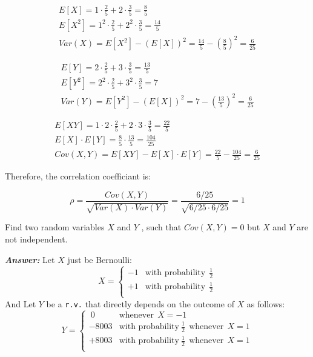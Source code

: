 \documentclass[12pt]{article}
\newenvironment{question}[2][Question]{\begin{trivlist}
\item[\hskip \labelsep {\bfseries #1}\hskip \labelsep {\bfseries #2.}]}{\end{trivlist}}
\begin{document}
\begin{align*}
E[X] = 1 \cdot \frac{2}{5} +  2 \cdot \frac{3}{5} = \frac{8}{5}        \\
E[X^2] = 1^2 \cdot  \frac{2}{5} +  2^2 \cdot \frac{3}{5} = \frac{14}{5}  \\
Var(X) = E[X^2]  - (E[X])^2 =  \frac{14}{5} - \left(\frac{8}{5} \right)^2 = \frac{6}{25}
\end{align*}


\begin{align*}
E[Y] = 2 \cdot \frac{2}{5} +  3 \cdot \frac{3}{5} = \frac{13}{5}        \\
E[Y^2] = 2^2 \cdot  \frac{2}{5} +  3^2 \cdot \frac{3}{5} = 7  \\
Var(Y) = E[Y^2]  - (E[X])^2 =  7 - \left(\frac{13}{5} \right)^2 = \frac{6}{25}
\end{align*}
 

\begin{align*}
E[XY] = 1 \cdot 2 \cdot \frac{2}{5} +  2 \cdot 3 \cdot \frac{3}{5} = \frac{22}{5}        \\
E[X] \cdot E[Y] = \frac{8}{5} \cdot \frac{13}{5} = \frac{104}{25}  \\
Cov(X,Y) = E[XY] - E[X] \cdot E[Y] = \frac{22}{5}  -  \frac{104}{25} = \frac{6}{25}
\end{align*}

Therefore, the correlation coefficiant is:

$$
\rho = \frac{Cov(X,Y)} {\sqrt{ Var(X) \cdot Var(Y) }} = \frac{6/25} {\sqrt{6/25 \cdot 6/25}} = 1
$$


\bigskip
\bigskip
\begin{question}{3.2}

Find two random variables $X$ and $Y$ , such that $Cov(X, Y ) = 0$ but $X$ and $Y$ are not independent.

\end{question}

 \textbf{\color{TealBlue}\emph{Answer:} } 
Let $X$ just be Bernoulli:
  \[ 
X = 
  \begin{cases} 
       -1    &  \text{with probability} \ \   \frac{1}{2} \\
       +1  &  \text{with probability}  \ \ \frac{1}{2} \\
   \end{cases}
\]
And Let $Y$ be a \texttt{r.v.} that directly depends on the outcome of $X$ as follows:
\[
Y = 
  \begin{cases} 
        \ 0  &  \text{whenever} \ \  X = -1 \\
       -8003    &  \text{with probability}\  \frac{1}{2} \ \   \text{whenever}  \ \ X = 1  \\
        +8003   &    \text{with probability}\  \frac{1}{2}  \ \ \text{whenever} \ \ X = 1  \\
   \end{cases}
\]
\end{document}
